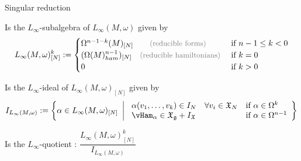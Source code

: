 \documentclass[beamer,10pt]{standalone}
\begin{document}
\begin{frame}{Singular reduction}
	\begin{defpropblock}
		Is the {\color{blue!70!black}$L_\infty$-subalgebra} of $L_\infty(M,\omega)$ given by
		\begin{displaymath}
			L_\infty(M,\omega)_{[N]}^k :=
			\begin{cases}
				\Omega^{n-1-k}(M)_{[N]} 
				\qquad\text{\color{gray}\small (reducible forms) }
				& \text{if } n-1\leq k < 0 \\
				(\Omega(M)_{ham}^{n-1})_{[N]} 
				\quad
				\text{\color{gray}\small (reducible hamiltonians) }
				& \text{if } k = 0 \\
				0 & \text{if } k > 0
			\end{cases}
		\end{displaymath}
	\end{defpropblock}
	\pause
	\begin{defpropblock}
		Is the {\color{blue!70!black}$L_\infty$-ideal} of $L_\infty(M,\omega)_{[N]}$ given by
		\begin{displaymath}
			I_{L_\infty(M,\omega)} :=
			\left\lbrace
				\alpha \in L_\infty(M,\omega)_{[N]}
			~\left\vert~
				\begin{array}{l l}
					\alpha(v_1,\dots,v_k) \in I_N  \quad \forall v_i \in \X_N &
					\text{if}~ \alpha \in \Omega^k \\
					\vHam_\alpha \in \X_\g + I_\X &
					\text{if}~ \alpha \in \Omega^{n-1}
				\end{array}
			\right\rbrace\right.
		\end{displaymath}
	\end{defpropblock}
	\pause
	\begin{defblock}
		Is the $L_\infty$-quotient : \quad
		$\dfrac{L_\infty(M,\omega)_{[N]}^k}{I_{L_\infty(M,\omega)}}$
	\end{defblock}

\end{frame}
\end{document}
